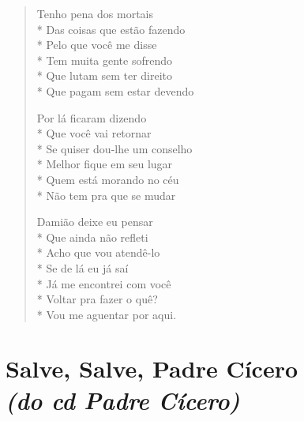 \begin{verse}
Tenho pena dos mortais\\*
Das coisas que estão fazendo\\*
Pelo que você me disse\\*
Tem muita gente sofrendo\\*
Que lutam sem ter direito\\*
Que pagam sem estar devendo

Por lá ficaram dizendo\\*
Que você vai retornar\\*
Se quiser dou-lhe um conselho\\*
Melhor fique em seu lugar\\*
Quem está morando no céu\\*
Não tem pra que se mudar

Damião deixe eu pensar\\*
Que ainda não refleti\\*
Acho que vou atendê-lo\\*
Se de lá eu já saí\\*
Já me encontrei com você\\*
Voltar pra fazer o quê?\\*
Vou me aguentar por aqui.
\end{verse}


\chapter[Salve, Salve, Padre Cícero]{Salve, Salve, Padre Cícero\\\smallskip\textit{(do cd Padre Cícero)}}

